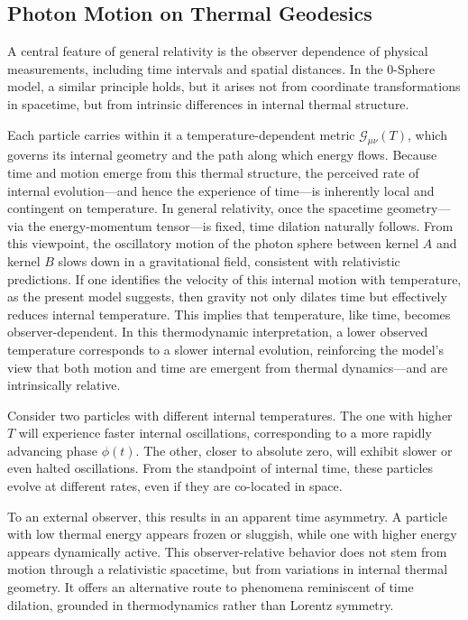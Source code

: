 \documentclass[%
 reprint,
 amsmath,amssymb,
 aps,
]{revtex4-1}
\numberwithin{equation}{section}%
\begin{document}
\subsection{Photon Motion on Thermal Geodesics}
\label{subsec:photon_thermal_geodesics}

A central feature of general relativity is the observer dependence of physical measurements, including time intervals and spatial distances. In the 0-Sphere model, a similar principle holds, but it arises not from coordinate transformations in spacetime, but from intrinsic differences in internal thermal structure.

Each particle carries within it a temperature-dependent metric $\mathcal{G}_{\mu\nu}(T)$, which governs its internal geometry and the path along which energy flows. Because time and motion emerge from this thermal structure, the perceived rate of internal evolution—and hence the experience of time—is inherently local and contingent on temperature. In general relativity, once the spacetime geometry—via the energy-momentum tensor—is fixed, time dilation naturally follows. From this viewpoint, the oscillatory motion of the photon sphere between kernel $A$ and kernel $B$ slows down in a gravitational field, consistent with relativistic predictions. If one identifies the velocity of this internal motion with temperature, as the present model suggests, then gravity not only dilates time but effectively reduces internal temperature. This implies that temperature, like time, becomes observer-dependent. In this thermodynamic interpretation, a lower observed temperature corresponds to a slower internal evolution, reinforcing the model’s view that both motion and time are emergent from thermal dynamics—and are intrinsically relative.

Consider two particles with different internal temperatures. The one with higher $T$ will experience faster internal oscillations, corresponding to a more rapidly advancing phase $\phi(t)$. The other, closer to absolute zero, will exhibit slower or even halted oscillations. From the standpoint of internal time, these particles evolve at different rates, even if they are co-located in space.

To an external observer, this results in an apparent time asymmetry. A particle with low thermal energy appears frozen or sluggish, while one with higher energy appears dynamically active. This observer-relative behavior does not stem from motion through a relativistic spacetime, but from variations in internal thermal geometry. It offers an alternative route to phenomena reminiscent of time dilation, grounded in thermodynamics rather than Lorentz symmetry.
\end{document}
